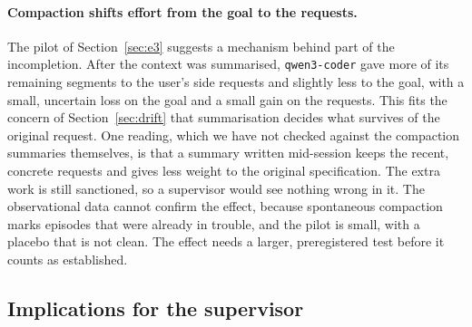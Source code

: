 \paragraph{Compaction shifts effort from the goal to the requests.} The pilot of
Section~\ref{sec:e3} suggests a mechanism behind part of the incompletion. After the context was
summarised, \texttt{qwen3-coder} gave more of its remaining segments to the user's side
requests and slightly less to the goal, with a small, uncertain loss on the goal and a small gain on
the requests. This fits the concern of Section~\ref{sec:drift} that summarisation decides what
survives of the original request. One reading, which we have not checked against the compaction
summaries themselves, is that a summary written mid-session keeps the recent, concrete requests and
gives less weight to the original specification. The extra work is still sanctioned, so a
supervisor would see nothing wrong in it. The observational data cannot confirm the effect, because spontaneous compaction marks episodes that
were already in trouble, and the pilot is small, with a placebo that is not clean. The effect needs a
larger, preregistered test before it counts as established.

\subsection{Implications for the supervisor}

